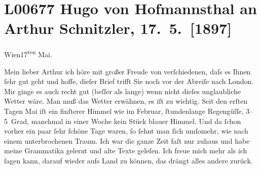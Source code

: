 

\section[Hugo von Hofmannsthal an Arthur Schnitzler, 17. 5. {[}1897{]}]{L00677 Hugo von Hofmannsthal an Arthur Schnitzler, 17. 5. {[}1897{]}}
\nopagebreak{}
\rehead{ }\normalsize\beginnumbering{}
\toendnotes[C]{\smallbreak\pagebreak[2]}
\pstart
           \raggedleft{}{\pb}Wien17\textsuperscript{ten} Mai.\pend
           
\pstart{}Mein lieber Arthur\pend\vspace{0.5em}
\pstart
           ich höre mit großer Freude von verſchiedenen, daſs es Ihnen ſehr gut  geht und hoffe, dieſer Brief trifft Sie noch vor der
               Abreiſe nach London. Mir ginge es auch recht gut
               (beſſer als lange) wenn nicht dieſes unglaubliche Wetter wäre. Man muß das Wetter
               erwähnen, es iſt {\pb}zu wichtig. Seit
               den erſten Tagen Mai iſt ein finſterer Himmel wie im Februar,
               ſtundenlange Regengüſſe, 3–5 Grad, manchmal in einer Woche kein Stück blauer Himmel.
               Und da ſchon vorher ein paar ſehr ſchöne Tage waren, ſo ſehnt man ſich umſomehr, wie
               nach einem unterbrochenen Traum. Ich war die ganze Zeit faſt nur zuhaus und habe
               meine Grammatika gelernt {\pb}und alte
               Texte geleſen. Ich freue mich mehr als ich ſagen kann, darauf wieder aufs Land zu
               können, das drängt alles andere zurück.\pend
           
